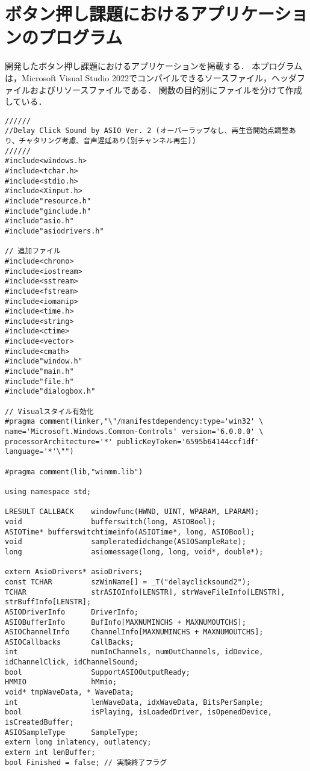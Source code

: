 \chapter{ボタン押し課題におけるアプリケーションのプログラム}
開発したボタン押し課題におけるアプリケーションを掲載する．
本プログラムは，Microsoft Visual Studio 2022でコンパイルできるソースファイル，ヘッダファイルおよびリソースファイルである．
関数の目的別にファイルを分けて作成している．

\begin{lstlisting}[caption=main.cpp]
  //////
//Delay Click Sound by ASIO Ver. 2 (オーバーラップなし、再生音開始点調整あり、チャタリング考慮、音声遅延あり(別チャンネル再生))
//////
#include<windows.h>
#include<tchar.h>
#include<stdio.h>
#include<Xinput.h>
#include"resource.h"
#include"ginclude.h"
#include"asio.h"
#include"asiodrivers.h"

// 追加ファイル
#include<chrono>
#include<iostream>
#include<sstream>
#include<fstream>
#include<iomanip>
#include<time.h>
#include<string>
#include<ctime>
#include<vector>
#include<cmath>
#include"window.h"
#include"main.h"
#include"file.h"
#include"dialogbox.h"

// Visualスタイル有効化
#pragma comment(linker,"\"/manifestdependency:type='win32' \
name='Microsoft.Windows.Common-Controls' version='6.0.0.0' \
processorArchitecture='*' publicKeyToken='6595b64144ccf1df' language='*'\"")

#pragma comment(lib,"winmm.lib")

using namespace std;

LRESULT CALLBACK	windowfunc(HWND, UINT, WPARAM, LPARAM);
void				bufferswitch(long, ASIOBool);
ASIOTime* bufferswitchtimeinfo(ASIOTime*, long, ASIOBool);
void				sampleratedidchange(ASIOSampleRate);
long				asiomessage(long, long, void*, double*);

extern AsioDrivers* asioDrivers;
const TCHAR			szWinName[] = _T("delayclicksound2");
TCHAR				strASIOInfo[LENSTR], strWaveFileInfo[LENSTR], strBuffInfo[LENSTR];
ASIODriverInfo		DriverInfo;
ASIOBufferInfo		BufInfo[MAXNUMINCHS + MAXNUMOUTCHS];
ASIOChannelInfo		ChannelInfo[MAXNUMINCHS + MAXNUMOUTCHS];
ASIOCallbacks		CallBacks;
int					numInChannels, numOutChannels, idDevice, idChannelClick, idChannelSound;
bool				SupportASIOOutputReady;
HMMIO				hMmio;
void* tmpWaveData, * WaveData;
int					lenWaveData, idxWaveData, BitsPerSample;
bool				isPlaying, isLoadedDriver, isOpenedDevice, isCreatedBuffer;
ASIOSampleType		SampleType;
extern long inlatency, outlatency;
extern int lenBuffer;
bool Finished = false; // 実験終了フラグ


\end{lstlisting}
